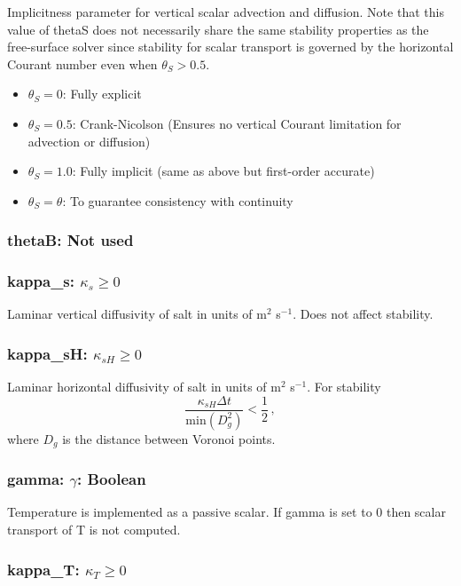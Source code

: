 Implicitness parameter for vertical scalar advection and diffusion.  Note that this
value of thetaS does not necessarily share the same stability properties as the
free-surface solver since stability for scalar transport is governed by
the horizontal Courant number even when $\theta_S>0.5$.
\begin{itemize}
\item $\theta_S=0$: Fully explicit 
\item $\theta_S=0.5$: Crank-Nicolson (Ensures no vertical Courant limitation for advection or diffusion)
\item $\theta_S=1.0$: Fully implicit (same as above but first-order accurate)
\item $\theta_S=\theta$: To guarantee consistency with continuity 
\end{itemize}

\subsubsection{thetaB: Not used}

\subsubsection{kappa\_s: $\kappa_s\ge 0$}

Laminar vertical diffusivity of salt in units of m$^2$ s$^{-1}$.  Does not affect stability.

\subsubsection{kappa\_sH: $\kappa_{sH}\ge 0$}

Laminar horizontal diffusivity of salt in units of m$^2$ s$^{-1}$.  For stability 
\[
\frac{\kappa_{sH}\Delta t}{\mbox{min}(D_g^2)}<\frac{1}{2}\,,
\]
where $D_g$ is the distance between Voronoi points.  

\subsubsection{gamma: $\gamma$: Boolean}

Temperature is implemented as a passive scalar.  If gamma is set to 0 then scalar
transport of T is not computed.

\subsubsection{kappa\_T: $\kappa_T\ge 0$}

